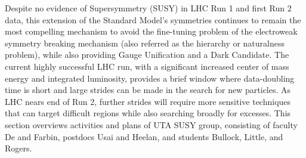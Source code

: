 Despite no evidence of Supersymmetry (SUSY) in LHC Run 1 and first Run
2 data, this extension of the Standard Model's symmetries continues to
remain the most compelling mechanism to avoid the fine-tuning problem
of the electroweak symmetry breaking mechanism (also referred as the
hierarchy or naturalness problem), while also providing Gauge
Unification and a Dark Candidate. The current highly successful LHC
run, with a significant increased center of mass energy and integrated
luminosity, provides a brief window where data-doubling time is short
and large strides can be made in the search for new particles. As LHC
nears end of Run 2, further strides will require more sensitive
techniques that can target difficult regions while also searching broadly
for excesses. This section overviews activities and plans of UTA SUSY
group, consisting of faculty De and Farbin, postdocs Usai and Heelan,
and students Bullock, Little, and Rogers.


